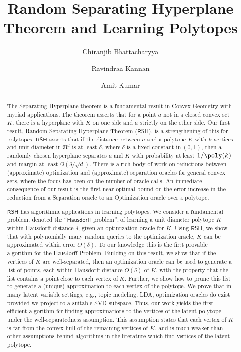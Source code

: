 \documentclass[11pt,letterpaper]{article}
\newcommand{\rsh}{{\mathsf {RSH}}\xspace}
\newcommand{\Hausdorf}{\mathsf {Hausdorff}\xspace }
\begin{document}
\title{Random Separating Hyperplane Theorem and Learning Polytopes}
\author{Chiranjib Bhattacharyya \and Ravindran Kannan \and Amit Kumar}
\maketitle
\begin{abstract}
The Separating Hyperplane theorem  is a fundamental result in Convex Geometry with myriad applications. The theorem asserts that for a point $a$ not in a closed convex set $K$, there is a hyperplane with $K$ on one side and $a$ strictly on the other side. Our first result, Random Separating Hyperplane  Theorem ($\rsh$), is a strengthening of this for polytopes. $\rsh$ asserts that if the distance between $a$ and a polytope $K$ with $k$ vertices and unit diameter in $\Re^d$ is at least $\delta$, where $\delta$ is a fixed constant in $(0,1)$, then a randomly chosen hyperplane separates $a$ and $K$ with probability at least $1/\poly(k)$ and  margin at least $\Omega \left( \delta/\sqrt{d} \right)$.
There is  a rich body of work on reductions between (approximate) optimization and (approximate) separation oracles for general convex sets, where the focus has been on the number of oracle calls. 
An immediate consequence of our result is the first near optimal bound on the error increase in the reduction from a Separation oracle to an Optimization oracle over a polytope.

$\rsh$  has algorithmic applications in learning polytopes. We consider a fundamental problem, denoted the ``$\Hausdorf$ problem'', of learning a unit diameter polytope $K$ within Hausdorff distance $\delta$,  given an optimization oracle for $K$.
Using $\rsh$, we show that with polynomially many random queries to the optimization oracle, $K$ can be approximated within error  $O(\delta)$. 
To our knowledge this is the first provable algorithm for the $\Hausdorf$ Problem.  Building on this result, we show that if the vertices of $K$ are well-separated, then an optimization oracle can be used to generate a list of points, each within Hausdorff distance $O(\delta)$  of $K$, with the property that the list contains a point close to each vertex of $K$. %
Further, we show how to prune this list to generate a (unique) approximation to each vertex of the polytope. We prove that in many latent variable settings, e.g., topic modeling, LDA,  optimization oracles do exist provided we project to a suitable SVD subspace. Thus, our work  yields the first efficient algorithm for finding approximations  to the vertices of the latent polytope under the well-separatedness assumption. This assumption states that each vertex of  $K$ is far from the convex hull of the remaining vertices of $K$, and is much weaker than other assumptions behind algorithms in the literature which find vertices of the latent polytope. 
\end{abstract}
\thispagestyle{empty}
\newpage
\setcounter{page}{1}
\end{document}
